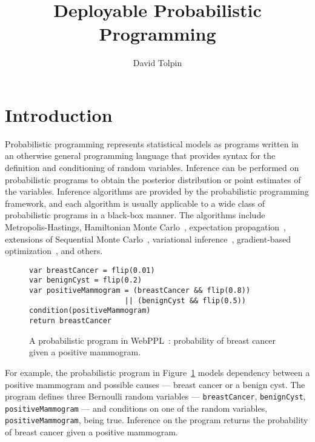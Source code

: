 \documentclass[sigplan,10pt,screen]{acmart}
\title{Deployable Probabilistic Programming}
\author{David Tolpin}
\affiliation{
    \institution{PUB+}
    \country{Israel}
}
\begin{document}
\maketitle

\begin{sloppypar}

\section{Introduction}

  Probabilistic programming \cite{GMR+08,MSP14,WVM14,GS15}
  represents statistical models as programs written in an
  otherwise general programming language that provides syntax
  for the definition and conditioning of random variables.
  Inference can be performed on probabilistic programs to
  obtain the posterior distribution or point estimates of the
  variables. Inference algorithms are provided by the
  probabilistic programming framework, and each algorithm is
  usually applicable to a wide class of probabilistic programs
  in a black-box manner. The algorithms include
  Metropolis-Hastings\cite{WSG11,MSP14,YHG14}, Hamiltonian
  Monte Carlo~\cite{Stan17}, expectation
  propagation~\cite{MWG+10}, extensions of Sequential Monte
  Carlo~\cite{WVM14,MYM+15,PWD+14,RNL+2016,MS18}, variational
  inference~\cite{WW13,KTR+17}, gradient-based
  optimization~\cite{Stan17,BCJ+19}, and others.

\begin{figure}
\begin{lstlisting}[language=WebPPL]
var breastCancer = flip(0.01)
var benignCyst = flip(0.2)
var positiveMammogram = (breastCancer && flip(0.8))
                      || (benignCyst && flip(0.5))
condition(positiveMammogram)
return breastCancer
\end{lstlisting}
  \caption{A probabilistic program in WebPPL~\cite{GS15}:
  probability of breast cancer given a positive mammogram.}
  \label{fig:mammo-webppl}
\end{figure}
  For example, the probabilistic program in
  Figure~\ref{fig:mammo-webppl} models dependency between
  a positive mammogram and possible causes --- breast cancer
  or a benign cyst.  The program defines three Bernoulli
  random variables  --- \lstinline{breastCancer},
  \lstinline{benignCyst}, \lstinline{positiveMammogram} ---
  and conditions on one of the random variables,
  \lstinline{positiveMammogram}, being true. Inference on the
  program returns the probability of breast cancer given a
  positive mammogram.


\end{sloppypar}
\end{document}
